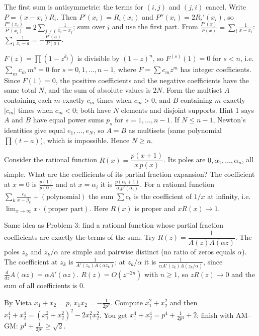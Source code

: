 \documentclass[11pt,a4paper]{article}
\begin{document}

 The first sum is antisymmetric: the terms for $(i,j)$ and $(j,i)$ cancel.
 Write $P=(x-x_i)R_i$. Then $P'(x_i)=R_i(x_i)$ and $P''(x_i)=2R_i'(x_i)$, so $\frac{P''(x_i)}{P'(x_i)}=2\sum_{j\ne i}\frac{1}{x_i-x_j}$; sum over $i$ and use the first part.
 From $\frac{P'(x)}{P(x)}=\sum_i\frac1{x-x_i}$: $\sum_i\frac1{x_i-a}=-\frac{P'(a)}{P(a)}$.

 $F(z)=\prod(1-z^{k_j})$ is divisible by $(1-z)^n$, so $F^{(s)}(1)=0$ for $s<n$, i.e.\ $\sum_m c_m\,m^s=0$ for $s=0,1,\dots,n-1$, where $F=\sum c_mz^m$ has integer coefficients.
 Since $F(1)=0$, the positive coefficients and the negative coefficients have the same total $N$, and the sum of absolute values is $2N$. Form the multiset $A$ containing each $m$ exactly $c_m$ times when $c_m>0$, and $B$ containing $m$ exactly $|c_m|$ times when $c_m<0$; both have $N$ elements and disjoint supports.
 Hint 1 says $A$ and $B$ have equal power sums $p_s$ for $s=1,\dots,n-1$. If $N\le n-1$, Newton's identities give equal $e_1,\dots,e_N$, so $A=B$ as multisets (same polynomial $\prod(t-a)$), which is impossible. Hence $N\ge n$.

 Consider the rational function $R(x)=\dfrac{p(x+1)}{x\,p(x)}$. Its poles are $0,\alpha_1,\dots,\alpha_n$, all simple. What are the coefficients of its partial fraction expansion?
 The coefficient at $x=0$ is $\frac{p(1)}{p(0)}$ and at $x=\alpha_i$ it is $\frac{p(\alpha_i+1)}{\alpha_ip'(\alpha_i)}$.
 For a rational function $\sum_k\frac{c_k}{x-\beta_k}+(\text{polynomial})$ the sum $\sum c_k$ is the coefficient of $1/x$ at infinity, i.e.\ $\lim_{x\to\infty}x\cdot(\text{proper part})$. Here $R(x)$ is proper and $xR(x)\to1$.

 Same idea as Problem 3: find a rational function whose partial fraction coefficients are exactly the terms of the sum. Try $R(z)=\dfrac{1}{A(z)A(\alpha z)}$.
 The poles $z_k$ and $z_k/\alpha$ are simple and pairwise distinct (no ratio of zeros equals $\alpha$). The coefficient at $z_k$ is $\frac{1}{A'(z_k)A(\alpha z_k)}$; at $z_k/\alpha$ it is $\frac{1}{\alpha A'(z_k)A(z_k/\alpha)}$, since $\frac{d}{dz}A(\alpha z)=\alpha A'(\alpha z)$.
 $R(z)=O(z^{-2n})$ with $n\ge1$, so $zR(z)\to0$ and the sum of all coefficients is $0$.

 By Vieta $x_1+x_2=p$, $x_1x_2=-\frac1{2p^2}$. Compute $x_1^2+x_2^2$ and then $x_1^4+x_2^4=(x_1^2+x_2^2)^2-2x_1^2x_2^2$.
 You get $x_1^4+x_2^4=p^4+\frac{1}{2p^4}+2$; finish with AM--GM: $p^4+\frac1{2p^4}\ge\sqrt2$.
\end{document}
